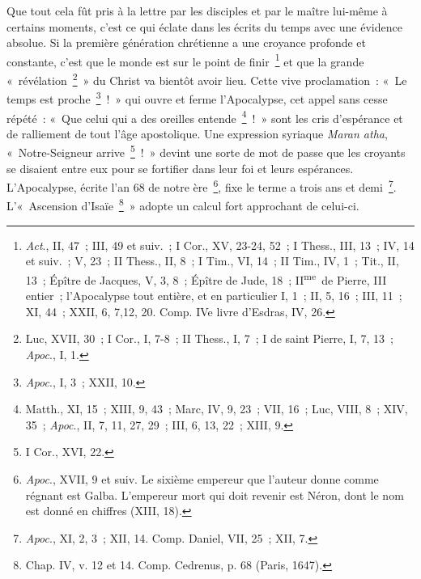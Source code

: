 \documentclass[french,twoside]{book} %
\begin{document}
Que tout cela fût pris à la lettre par les disciples et par le maître lui-même à certains moments, c’est ce qui éclate dans les écrits du temps avec une évidence absolue. Si la première génération chrétienne a une croyance profonde et constante, c’est que le monde est sur le point de finir \footnote{{\itshape Act}., II, 47 ; III, 49 et suiv. ; I Cor., XV, 23-24, 52 ; I Thess., III, 13 ; IV, 14 et suiv. ; V, 23 ; II Thess., II, 8 ; I Tim., VI, 14 ; II Tim., IV, 1 ; Tit., II, 13 ; Épître de Jacques, V, 3, 8 ; Épître de Jude, 18 ; II\textsuperscript{me} de Pierre, III entier ; l’Apocalypse tout entière, et en particulier I, 1 ; II, 5, 16 ; III, 11 ; XI, 44 ; XXII, 6, 7,12, 20. Comp. IVe livre d’Esdras, IV, 26.} et que la grande « révélation \footnote{ Luc, XVII, 30 ; I Cor., I, 7-8 ; II Thess., I, 7 ; I de saint Pierre, I, 7, 13 ; {\itshape Apoc}., I, 1.} » du Christ va bientôt avoir lieu. Cette vive proclamation : « Le temps est proche \footnote{{\itshape Apoc}., I, 3 ; XXII, 10.} ! » qui ouvre et ferme l’Apocalypse, cet appel sans cesse répété : « Que celui qui a des oreilles entende \footnote{ Matth., XI, 15 ; XIII, 9, 43 ; Marc, IV, 9, 23 ; VII, 16 ; Luc, VIII, 8 ; XIV, 35 ; {\itshape Apoc}., II, 7, 11, 27, 29 ; III, 6, 13, 22 ; XIII, 9.} ! » sont les cris d’espérance et de ralliement de tout l’âge apostolique. Une expression syriaque {\itshape Maran atha}, « Notre-Seigneur arrive \footnote{I Cor., XVI, 22.} ! » devint une sorte de mot de passe que les croyants se disaient entre eux pour se fortifier dans leur foi et leurs espérances. L’Apocalypse, écrite l’an 68 de notre ère \footnote{{\itshape Apoc}., XVII, 9 et suiv. Le sixième empereur que l’auteur donne comme régnant est Galba. L’empereur mort qui doit revenir est Néron, dont le nom est donné en chiffres (XIII, 18).}, fixe le terme a trois ans et demi \footnote{{\itshape Apoc}., XI, 2, 3 ; XII, 14. Comp. Daniel, VII, 25 ; XII, 7.}. L’« Ascension d’Isaïe \footnote{Chap. IV, v. 12 et 14. Comp. Cedrenus, p. 68 (Paris, 1647).} » adopte un calcul fort approchant de celui-ci.\par
\end{document}
